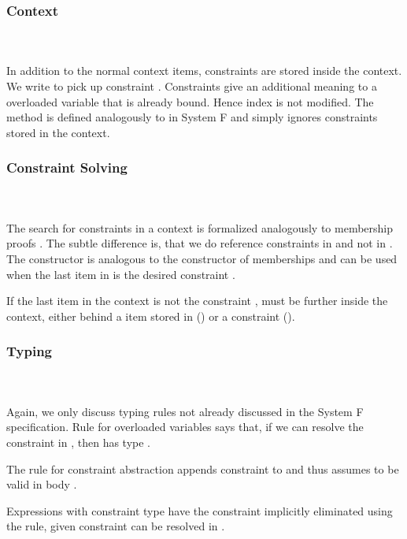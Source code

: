 \subsubsection{Context}\hfill\\\\
In addition to the normal context items, constraints are stored inside the context.
\FoCtx
We write    to pick up constraint . 
Constraints give an additional meaning to a overloaded variable that is already bound. Hence index  is not modified. The  method is defined analogously to  in System F and simply ignores constraints stored in the context.

\subsubsection{Constraint Solving}\hfill\\\\
The search for constraints in a context is formalized analogously to membership proofs   . The subtle difference is, that we do reference constraints in  and not in . 
\FoCstrSolve
The  constructor is analogous to the  constructor of memberships and can be used when the last item in  is the desired constraint .

\noindent If the last item in the context is not the constraint ,  must be further inside the context, either behind a item stored in  () or a constraint (). 

\subsubsection{Typing}\hfill\\\\
Again, we only discuss typing rules not already discussed in the System F specification. 
\FoTyping
Rule  for overloaded variables says that, if we can resolve the constraint  \Constr{:}  in , then  has type . 

\noindent The rule for constraint abstraction  appends constraint  to  and thus assumes  to be valid in body . 

\noindent Expressions  with constraint type \Constr{[}  \Constr{]⇒}  have the constraint implicitly eliminated using the  rule, given constraint  can be resolved in . 

